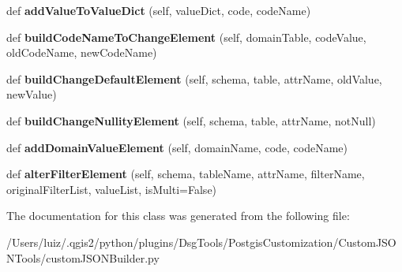 \begin{DoxyCompactItemize}
\item 
\mbox{\label{class_dsg_tools_1_1_postgis_customization_1_1_custom_j_s_o_n_tools_1_1custom_j_s_o_n_builder_1_1_custom_j_s_o_n_builder_aae4a99980cc9637841390ca9c8016aee}} 
def {\bfseries add\+Value\+To\+Value\+Dict} (self, value\+Dict, code, code\+Name)
\item 
\mbox{\label{class_dsg_tools_1_1_postgis_customization_1_1_custom_j_s_o_n_tools_1_1custom_j_s_o_n_builder_1_1_custom_j_s_o_n_builder_ac66901b71471e1963abe5ce1101dbd73}} 
def {\bfseries build\+Code\+Name\+To\+Change\+Element} (self, domain\+Table, code\+Value, old\+Code\+Name, new\+Code\+Name)
\item 
\mbox{\label{class_dsg_tools_1_1_postgis_customization_1_1_custom_j_s_o_n_tools_1_1custom_j_s_o_n_builder_1_1_custom_j_s_o_n_builder_a52789d677c6830d923118efce1bdc4e3}} 
def {\bfseries build\+Change\+Default\+Element} (self, schema, table, attr\+Name, old\+Value, new\+Value)
\item 
\mbox{\label{class_dsg_tools_1_1_postgis_customization_1_1_custom_j_s_o_n_tools_1_1custom_j_s_o_n_builder_1_1_custom_j_s_o_n_builder_ae2154ad9b4fcdc1d0bf4b4794db7c8db}} 
def {\bfseries build\+Change\+Nullity\+Element} (self, schema, table, attr\+Name, not\+Null)
\item 
\mbox{\label{class_dsg_tools_1_1_postgis_customization_1_1_custom_j_s_o_n_tools_1_1custom_j_s_o_n_builder_1_1_custom_j_s_o_n_builder_afbaa55eb6cd6c7b3a84e3e00b537a333}} 
def {\bfseries add\+Domain\+Value\+Element} (self, domain\+Name, code, code\+Name)
\item 
\mbox{\label{class_dsg_tools_1_1_postgis_customization_1_1_custom_j_s_o_n_tools_1_1custom_j_s_o_n_builder_1_1_custom_j_s_o_n_builder_af1bb79141da4bfb5be668aeb766d2200}} 
def {\bfseries alter\+Filter\+Element} (self, schema, table\+Name, attr\+Name, filter\+Name, original\+Filter\+List, value\+List, is\+Multi=False)
\end{DoxyCompactItemize}


The documentation for this class was generated from the following file\+:\begin{DoxyCompactItemize}
\item 
/\+Users/luiz/.\+qgis2/python/plugins/\+Dsg\+Tools/\+Postgis\+Customization/\+Custom\+J\+S\+O\+N\+Tools/custom\+J\+S\+O\+N\+Builder.\+py\end{DoxyCompactItemize}
